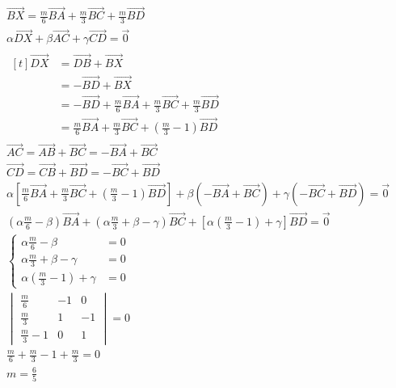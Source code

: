 \documentclass[brazilian, fleqn]{article}
\renewcommand{\vec}[1]{\overrightarrow{#1}}
\begin{document}
\begin{gather}
    \vec{BX}=\frac{m}{6}\vec{BA}+\frac{m}{3}\vec{BC}+\frac{m}{3}\vec{BD}\\
    \alpha \vec{DX}+\beta \vec{AC}+\gamma \vec{CD} = \vec{0} \\
    \begin{aligned}[t]
        \vec{DX}&=\vec{DB}+\vec{BX}\\
                &=-\vec{BD}+\vec{BX}\\
                &=-\vec{BD}+\frac{m}{6}\vec{BA}+\frac{m}{3}\vec{BC}+\frac{m}{3}\vec{BD}\\
                &=\frac{m}{6}\vec{BA}+\frac{m}{3}\vec{BC}+\left(\frac{m}{3}-1\right)\vec{BD}
    \end{aligned} \\
    \vec{AC}=\vec{AB}+\vec{BC}=-\vec{BA}+\vec{BC}\\
    \vec{CD}=\vec{CB}+\vec{BD}=-\vec{BC}+\vec{BD}\\
    \alpha \left[\frac{m}{6}\vec{BA}+\frac{m}{3}\vec{BC}+\left(\frac{m}{3}-1\right)\vec{BD}\right]+
    \beta \left(-\vec{BA}+\vec{BC}\right)+ \gamma \left(-\vec{BC}+\vec{BD}\right) = \vec{0} \\
    \left(\alpha\frac{m}{6}-\beta\right)\vec{BA}+\left(\alpha\frac{m}{3}+\beta-\gamma\right)\vec{BC}+
    \left[\alpha\left(\frac{m}{3}-1\right)+\gamma\right]\vec{BD}=\vec{0} \\
    \begin{cases}
        \alpha\frac{m}{6}-\beta &=0 \\
        \alpha\frac{m}{3}+\beta-\gamma &=0 \\
        \alpha\left(\frac{m}{3}-1\right)+\gamma &=0
    \end{cases} \\
    \begin{vmatrix}
        \frac{m}{6} & -1 & 0 \\
        \frac{m}{3} & 1 & -1 \\
        \frac{m}{3}-1 & 0 & 1
    \end{vmatrix} = 0 \\
    \frac{m}{6}+\frac{m}{3}-1+\frac{m}{3}=0 \\
    m=\frac{6}{5}
\end{gather}
\end{document}
